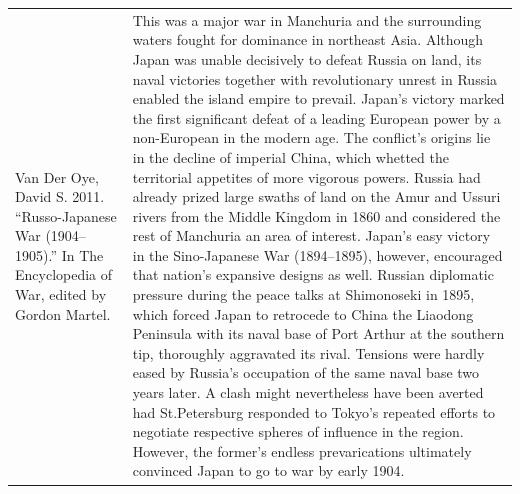 {\begin{longtable}{p{}p{}}
\\
Van Der Oye, David S. 2011. “Russo-Japanese War (1904–1905).” In The Encyclopedia of War, edited by Gordon Martel. & This was a major war in Manchuria and the surrounding waters fought for dominance in northeast Asia. Although Japan was unable decisively to defeat Russia on land, its naval victories together with revolutionary unrest in Russia enabled the island empire to prevail. Japan's victory marked the first significant defeat of a leading European power by a non-European in the modern age. The conflict's origins lie in the decline of imperial China, which whetted the territorial appetites of more vigorous powers. Russia had already prized large swaths of land on the Amur and Ussuri rivers from the Middle Kingdom in 1860 and considered the rest of Manchuria an area of interest. Japan's easy victory in the Sino-Japanese War (1894–1895), however, encouraged that nation's expansive designs as well.  Russian diplomatic pressure during the peace talks at Shimonoseki in 1895, which forced Japan to retrocede to China the Liaodong Peninsula with its naval base of Port Arthur at the southern tip, thoroughly aggravated its rival. Tensions were hardly eased by Russia's occupation of the same naval base two years later. A clash might nevertheless have been averted had St.Petersburg responded to Tokyo's repeated efforts to negotiate respective spheres of influence in the region. However, the former's endless prevarications ultimately convinced Japan to go to war by early 1904.
\\

\end{longtable}}
